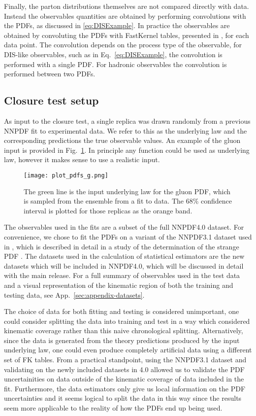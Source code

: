Finally, the parton distributions themselves are not compared directly with data.
Instead the observables quantities are obtained by performing convolutions with
the PDFs, as discussed in \ref{eq:DISExample}. In practice the observables are
obtained by convoluting the PDFs with FastKernel tables, presented in
\cite{Ball_2010,Bertone_2017}, for each data point. The convolution depends
on the process type of the observable, for DIS-like observables, such as in
Eq.~\ref{eq:DISExample}, the convolution is performed with a single PDF. For
hadronic observables the convolution is performed between two PDFs.

\subsection{Closure test setup}

As input to the closure test, a single replica was drawn randomly from
a previous NNPDF fit to experimental data. We refer to this as the underlying
law and the corresponding predictions the true observable values. An example
of the gluon input is provided in Fig.~\ref{fig:InputGluonPDF}. In principle
any function could be used as underlying law, however it makes sense to
use a realistic input.

\begin{figure}
    \centering
    \texttt{[image: plot\_pdfs\_g.png]}
    \caption{The green line is the input underlying law for the gluon PDF,
    which is sampled from the ensemble from a fit to data. The 68\% confidence
    interval is plotted for those replicas as the orange band.}
    \label{fig:InputGluonPDF}
\end{figure}

The observables used in the fits are a subset of the full NNPDF4.0 dataset.
For convenience,
we chose to fit the PDFs on a variant of the NNPDF3.1 dataset used in
\cite{Ball_2018}, which is described in detail in a study of the determination
of the strange PDF \cite{Faura_2020}. The datasets used in the calculation of
statistical estimators are the new datasets which will be included in NNPDF4.0,
which will be discussed in detail with the main release. For a full summary of
observables used in the test data and a visual representation of the kinematic
region of both the training and testing data, see App.~\ref{sec:appendix-datasets}.

The choice of data for both fitting and testing is
considered unimportant, one could consider splitting the data into training
and test in a way which considered kinematic coverage rather than this
naive chronological splitting. Alternatively, since the data is generated from
the theory predictions produced by the input underlying law, one could even
produce completely artificial data using a different set of FK tables. From a
practical standpoint, using the NNPDF3.1 dataset and validating on the newly
included
datasets in 4.0 allowed us to validate the PDF uncertainities on data outside
of the kinematic coverage of data included in the fit. Furthermore, the data estimators
only give us local information on the PDF uncertainties and it seems
logical to split the data in this way since the results seem more applicable to
the reality of how the PDFs end up being used.

